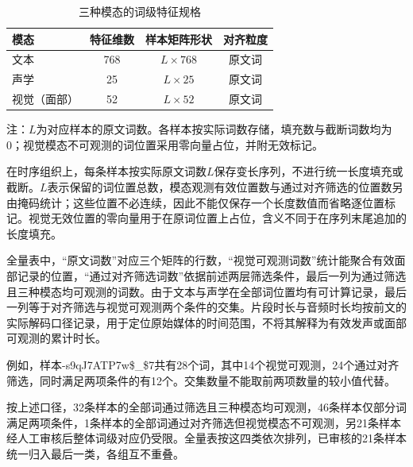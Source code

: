 \begin{table}[H]
    \centering\small
    \caption{三种模态的词级特征规格}
    \label{tab:p1_feature_specification}
    \setlength{\tabcolsep}{6pt}
    \renewcommand{\arraystretch}{1.12}
    \ifdefined\pOneCompactTableBox\else\newsavebox{\pOneCompactTableBox}\fi
    \begin{lrbox}{\pOneCompactTableBox}
    \begin{tabular}{lccc}
        \toprule
        模态 & 特征维数 & 样本矩阵形状 & 对齐粒度\\
        \midrule
        文本 & 768 & $L\times768$ & 原文词\\
        声学 & 25 & $L\times25$ & 原文词\\
        视觉（面部） & 52 & $L\times52$ & 原文词\\
        \bottomrule
    \end{tabular}
    \end{lrbox}
    \usebox{\pOneCompactTableBox}
\par\smallskip
\parbox{\wd\pOneCompactTableBox}{\footnotesize 注：$L$为对应样本的原文词数。各样本按实际词数存储，填充数与截断词数均为0；视觉模态不可观测的词位置采用零向量占位，并附无效标记。}
\end{table}

在时序组织上，每条样本按实际原文词数$L$保存变长序列，不进行统一长度填充或截断。$L$表示保留的词位置总数，模态观测有效位置数与通过对齐筛选的位置数另由掩码统计；这些位置不必连续，因此不能仅保存一个长度数值而省略逐位置标记。视觉无效位置的零向量用于在原词位置上占位，含义不同于在序列末尾追加的长度填充。

全量表中，“原文词数”对应三个矩阵的行数，“视觉可观测词数”统计能聚合有效面部记录的位置，“通过对齐筛选词数”依据前述两层筛选条件，最后一列为通过筛选且三种模态均可观测的词数。由于文本与声学在全部词位置均有可计算记录，最后一列等于对齐筛选与视觉可观测两个条件的交集。片段时长与音频时长均按前文的实际解码口径记录，用于定位原始媒体的时间范围，不将其解释为有效发声或面部可观测的累计时长。

例如，样本-s9qJ7ATP7w\$\_\$7共有28个词，其中14个视觉可观测，24个通过对齐筛选，同时满足两项条件的有12个。交集数量不能取前两项数量的较小值代替。

按上述口径，32条样本的全部词通过筛选且三种模态均可观测，46条样本仅部分词满足两项条件，1条样本的全部词通过对齐筛选但视觉模态不可观测，另21条样本经人工审核后整体词级对应仍受限。全量表按这四类依次排列，已审核的21条样本统一归入最后一类，各组互不重叠。

